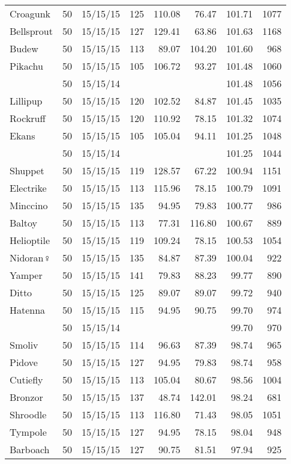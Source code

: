 \begin{longtable}{lrrrrrrr}
Croagunk & 50 & 15/15/15 & 125 & 110.08 & 76.47 & 101.71 & 1077\\
Bellsprout & 50 & 15/15/15 & 127 & 129.41 & 63.86 & 101.63 & 1168\\
Budew & 50 & 15/15/15 & 113 & 89.07 & 104.20 & 101.60 &  968\\
Pikachu & 50 & 15/15/15 & 105 & 106.72 & 93.27 & 101.48 & 1060\\
 & 50 & 15/15/14 & & & & 101.48 & 1056\\
Lillipup & 50 & 15/15/15 & 120 & 102.52 & 84.87 & 101.45 & 1035\\
Rockruff & 50 & 15/15/15 & 120 & 110.92 & 78.15 & 101.32 & 1074\\
Ekans & 50 & 15/15/15 & 105 & 105.04 & 94.11 & 101.25 & 1048\\
 & 50 & 15/15/14 & & & & 101.25 & 1044\\
Shuppet & 50 & 15/15/15 & 119 & 128.57 & 67.22 & 100.94 & 1151\\
Electrike & 50 & 15/15/15 & 113 & 115.96 & 78.15 & 100.79 & 1091\\
Minccino & 50 & 15/15/15 & 135 & 94.95 & 79.83 & 100.77 &  986\\
Baltoy & 50 & 15/15/15 & 113 & 77.31 & 116.80 & 100.67 &  889\\
Helioptile & 50 & 15/15/15 & 119 & 109.24 & 78.15 & 100.53 & 1054\\
Nidoran♀ & 50 & 15/15/15 & 135 & 84.87 & 87.39 & 100.04 &  922\\
Yamper & 50 & 15/15/15 & 141 & 79.83 & 88.23 & 99.77 &  890\\
Ditto & 50 & 15/15/15 & 125 & 89.07 & 89.07 & 99.72 &  940\\
Hatenna & 50 & 15/15/15 & 115 & 94.95 & 90.75 & 99.70 &  974\\
 & 50 & 15/15/14 & & & & 99.70 &  970\\
Smoliv & 50 & 15/15/15 & 114 & 96.63 & 87.39 & 98.74 &  965\\
Pidove & 50 & 15/15/15 & 127 & 94.95 & 79.83 & 98.74 &  958\\
Cutiefly & 50 & 15/15/15 & 113 & 105.04 & 80.67 & 98.56 & 1004\\
Bronzor & 50 & 15/15/15 & 137 & 48.74 & 142.01 & 98.24 &  681\\
Shroodle & 50 & 15/15/15 & 113 & 116.80 & 71.43 & 98.05 & 1051\\
Tympole & 50 & 15/15/15 & 127 & 94.95 & 78.15 & 98.04 &  948\\
Barboach & 50 & 15/15/15 & 127 & 90.75 & 81.51 & 97.94 &  925\\

\end{longtable}
